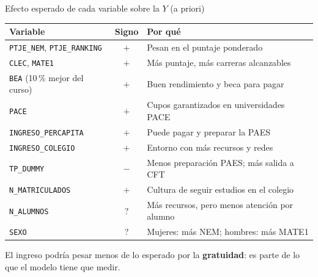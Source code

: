 
\begin{frame}{Efecto esperado de cada variable sobre la $Y$ (a priori)}
  \centering
  \footnotesize
  \begin{tabular}{lcl}
    \toprule
    \textbf{Variable} & \textbf{Signo} & \textbf{Por qué} \\
    \midrule
    \texttt{PTJE\_NEM}, \texttt{PTJE\_RANKING} & $+$ & Pesan en el puntaje ponderado \\
    \texttt{CLEC}, \texttt{MATE1}               & $+$ & Más puntaje, más carreras alcanzables \\
    \texttt{BEA} (10\,\% mejor del curso)       & $+$ & Buen rendimiento y beca para pagar \\
    \texttt{PACE}                               & $+$ & Cupos garantizados en universidades PACE \\
    \midrule
    \texttt{INGRESO\_PERCAPITA}                 & $+$ & Puede pagar y preparar la PAES \\
    \texttt{INGRESO\_COLEGIO}                   & $+$ & Entorno con más recursos y redes \\
    \texttt{TP\_DUMMY}                          & $-$ & Menos preparación PAES; más salida a CFT \\
    \midrule
    \texttt{N\_MATRICULADOS}                    & $+$ & Cultura de seguir estudios en el colegio \\
    \texttt{N\_ALUMNOS}                         & ?   & Más recursos, pero menos atención por alumno \\
    \texttt{SEXO}                               & ?   & Mujeres: más NEM; hombres: más MATE1 \\
    \bottomrule
  \end{tabular}

  \medskip
  El ingreso podría pesar menos de lo esperado por la \textbf{gratuidad}:
  es parte de lo que el modelo tiene que medir.
\end{frame}

